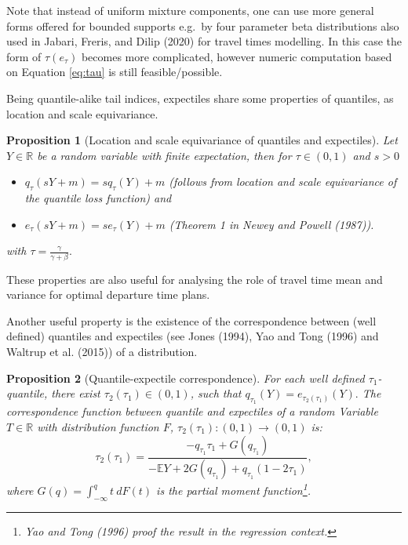 \documentclass[
]{article}
\newtheorem{proposition}{Proposition}[section]
\theoremstyle{definition}
\theoremstyle{definition}
\theoremstyle{definition}
\theoremstyle{definition}
\theoremstyle{remark}
\begin{document}
Note that instead of uniform mixture components, one can use more general forms offered for bounded supports e.g.~by four parameter beta distributions also used in Jabari, Freris, and Dilip (2020) for travel times modelling. In this case the form of \(\tau(e_\tau)\) becomes more complicated, however numeric computation based on Equation \eqref{eq:tau} is still feasible/possible.

Being quantile-alike tail indices, expectiles share some properties of quantiles, as location and scale equivariance.

\begin{proposition}[Location and scale equivariance of quantiles and expectiles]
\protect\hypertarget{prp:propprops}{}\label{prp:propprops}Let \(Y\in\mathbb R\) be a random variable with finite expectation, then for \(\tau \in (0,1)\) and \(s>0\)

\begin{itemize}
\item
  \(q_\tau(sY+m) = sq_\tau(Y) + m\) (follows from location and scale equivariance of the quantile loss function) and
\item
  \(e_\tau(sY+m)=se_\tau(Y) + m\) (Theorem 1 in Newey and Powell (1987)).
\end{itemize}

with \(\tau=\frac{\gamma}{\gamma+\beta}.\)
\end{proposition}

These properties are also useful for analysing the role of travel time mean and variance for optimal departure time plans.

Another useful property is the existence of the correspondence between (well defined) quantiles and expectiles (see Jones (1994), Yao and Tong (1996) and Waltrup et al. (2015)) of a distribution.

\begin{proposition}[Quantile-expectile correspondence]
\protect\hypertarget{prp:corr}{}\label{prp:corr}For each well defined \(\tau_1\)-quantile, there exist \(\tau_2(\tau_1)\in(0,1)\), such that \(q_{\tau_1}(Y) = e_{\tau_2(\tau_1)}(Y).\)
The correspondence function between quantile and expectiles of a random Variable \(T\in \mathbb R\) with distribution function \(F\), \(\tau_2(\tau_1):(0,1)\rightarrow(0,1)\) is:
\[\tau_2 (\tau_1) = \frac{-q_{\tau_1}\tau_1 + G(q_{\tau_1})}{-\mathbb EY + 2G(q_{\tau_1})+q_{\tau_1}(1-2\tau_1)},\]
where \(G(q) = \int_{-\infty}^qt~dF(t)\) is the partial moment function\footnote{Yao and Tong (1996) proof the result in the regression context.}.
\end{proposition}
\end{document}
